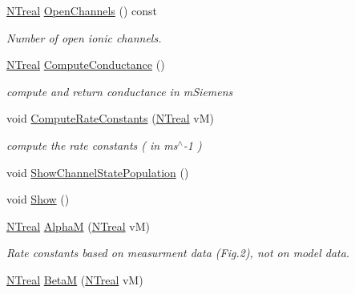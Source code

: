 \begin{DoxyCompactItemize}
\item 
\hyperlink{nt__types_8h_a814a97893e9deb1eedcc7604529ba80d}{NTreal} \hyperlink{class_n_t_b_p__colbert__axonal__sodium__multi__current__o_ac037495da74e9c9e5bb3000305b4f39d}{OpenChannels} () const 
\begin{DoxyCompactList}\small\item\em Number of open ionic channels. \item\end{DoxyCompactList}\item 
\hyperlink{nt__types_8h_a814a97893e9deb1eedcc7604529ba80d}{NTreal} \hyperlink{class_n_t_b_p__colbert__axonal__sodium__multi__current__o_ad671743b09496a7dae450c9d49326c1f}{ComputeConductance} ()
\begin{DoxyCompactList}\small\item\em compute and return conductance in mSiemens \item\end{DoxyCompactList}\item 
void \hyperlink{class_n_t_b_p__colbert__axonal__sodium__multi__current__o_a4533a0a797b8b28450589f6294d6bf9a}{ComputeRateConstants} (\hyperlink{nt__types_8h_a814a97893e9deb1eedcc7604529ba80d}{NTreal} vM)
\begin{DoxyCompactList}\small\item\em compute the rate constants ( in ms$^\wedge$-\/1 ) \item\end{DoxyCompactList}\item 
void \hyperlink{class_n_t_b_p__colbert__axonal__sodium__multi__current__o_a0a78b1710a96d3ddca59923681f622bc}{ShowChannelStatePopulation} ()
\item 
void \hyperlink{class_n_t_b_p__colbert__axonal__sodium__multi__current__o_ae29830ba29fbd1d474e85c3b1c492547}{Show} ()
\item 
\hyperlink{nt__types_8h_a814a97893e9deb1eedcc7604529ba80d}{NTreal} \hyperlink{class_n_t_b_p__colbert__axonal__sodium__multi__current__o_a6ef6fe8ffc952157aebbf66ad64de25b}{AlphaM} (\hyperlink{nt__types_8h_a814a97893e9deb1eedcc7604529ba80d}{NTreal} vM)
\begin{DoxyCompactList}\small\item\em Rate constants based on measurment data (Fig.2), not on model data. \item\end{DoxyCompactList}\item 
\hyperlink{nt__types_8h_a814a97893e9deb1eedcc7604529ba80d}{NTreal} \hyperlink{class_n_t_b_p__colbert__axonal__sodium__multi__current__o_af2cf422bb3d2ee1b47777994e5fcbe50}{BetaM} (\hyperlink{nt__types_8h_a814a97893e9deb1eedcc7604529ba80d}{NTreal} vM)

\end{DoxyCompactItemize}
